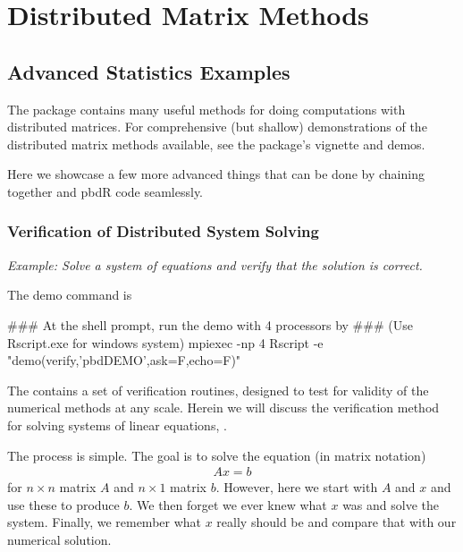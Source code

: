 \part{Distributed Matrix Methods}
\label{part:dmat}


\chapter{Advanced Statistics Examples}

The  package contains many useful methods for doing computations with distributed matrices.  For comprehensive (but shallow) demonstrations of the distributed matrix methods available, see the  package's vignette and demos.

Here we showcase a few more advanced things that can be done by chaining together  and pbdR code seamlessly.

\section{Verification of Distributed System Solving}

\emph{Example:  Solve a system of equations and verify that the solution is correct.}

The demo command is
\begin{Command}
### At the shell prompt, run the demo with 4 processors by
### (Use Rscript.exe for windows system)
mpiexec -np 4 Rscript -e "demo(verify,'pbdDEMO',ask=F,echo=F)"
\end{Command}

The  contains a set of verification routines, designed to test for validity of the numerical methods at any scale.  Herein we will discuss the verification method for solving systems of linear equations, .

The process is simple.  The goal is to solve the equation (in matrix notation)
\begin{align*}
Ax=b
\end{align*}
for $n\times n$ matrix $A$ and $n\times 1$ matrix $b$.  However, here we start with $A$ and $x$ and use these to produce $b$.  We then forget we ever knew what $x$ was and solve the system.  Finally, we remember what $x$ really should be and compare that with our numerical solution.
  
